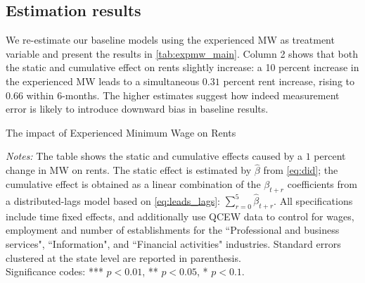 \subsection{Estimation results}

We re-estimate our baseline models using the experienced MW as treatment variable and present 
the results in \autoref{tab:expmw_main}. Column 2 shows that both the static and cumulative 
effect on rents slightly increase: a 10 percent increase in the experienced MW leads to a simultaneous
$0.31$ percent rent increase, rising to $0.66$ within 6-months. The higher estimates suggest how 
indeed measurement error is likely to introduce downward bias in baseline results.



\begin{table}[h!]\centering
	\caption{The impact of Experienced Minimum Wage on Rents}
	\label{tab:expmw_main}
	
	\begin{minipage}{\textwidth}\footnotesize
		\vspace{3mm}	
		\textit{Notes:} The table shows the static and cumulative effects caused by a $1$ percent
		change in MW on rents. The static effect is estimated by $\hat{\beta}$ from \autoref{eq:did};
		the cumulative effect is obtained as a linear combination of the $\beta_{t+r}$ coefficients from 
		a distributed-lags model based on \autoref{eq:leads_lags}: 
		$\sum\limits_{r = 0}^5 \hat{\beta}_{t+r}$. All specifications include time fixed effects, 
		and additionally use QCEW data to control for wages, employment and number of establishments 
		for the ``Professional and business services", ``Information", and ``Financial activities" industries.
		Standard errors clustered at the state level are
		reported in parenthesis. \\
		Significance codes: *** $p < 0.01$, ** $p < 0.05$, * $p < 0.1$. 	
	\end{minipage}
\end{table}



